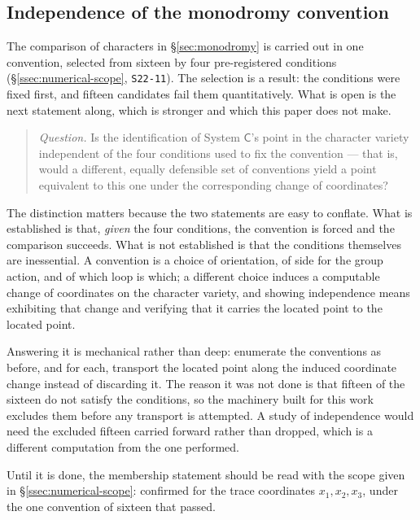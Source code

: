 \subsection{Independence of the monodromy convention}\label{ssec:convention-independence}

The comparison of characters in \S\ref{sec:monodromy} is carried out in one
convention, selected from sixteen by four pre-registered conditions
(\S\ref{ssec:numerical-scope}, \texttt{S22-11}). The selection is a result: the
conditions were fixed first, and fifteen candidates fail them quantitatively.
What is open is the next statement along, which is stronger and which this
paper does not make.

\begin{quote}
\emph{Question.} Is the identification of System $\mathsf C$'s point in the
character variety independent of the four conditions used to fix the
convention --- that is, would a different, equally defensible set of
conventions yield a point equivalent to this one under the corresponding
change of coordinates?
\end{quote}

The distinction matters because the two statements are easy to conflate. What
is established is that, \emph{given} the four conditions, the convention is
forced and the comparison succeeds. What is not established is that the
conditions themselves are inessential. A convention is a choice of orientation,
of side for the group action, and of which loop is which; a different choice
induces a computable change of coordinates on the character variety, and
showing independence means exhibiting that change and verifying that it carries
the located point to the located point.

Answering it is mechanical rather than deep: enumerate the conventions as
before, and for each, transport the located point along the induced coordinate
change instead of discarding it. The reason it was not done is that fifteen of
the sixteen do not satisfy the conditions, so the machinery built for this work
excludes them before any transport is attempted. A study of independence would
need the excluded fifteen carried forward rather than dropped, which is a
different computation from the one performed.

Until it is done, the membership statement should be read with the scope given
in \S\ref{ssec:numerical-scope}: confirmed for the trace coordinates
$x_1,x_2,x_3$, under the one convention of sixteen that passed.
